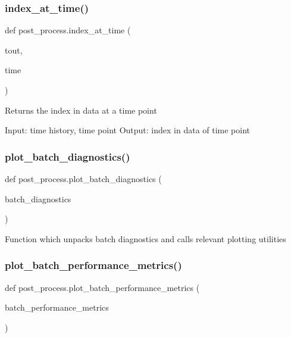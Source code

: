 \subsubsection{\texorpdfstring{index\_at\_time()}{index\_at\_time()}}
{\footnotesize\ttfamily def post\+\_\+process.\+index\+\_\+at\+\_\+time (\begin{DoxyParamCaption}\item[{}]{tout,  }\item[{}]{time }\end{DoxyParamCaption})}

\begin{DoxyVerb}Returns the index in data at a time point

Input: time history, time point
Output: index in data of time point\end{DoxyVerb}
 \mbox{\label{namespacepost__process_ad0319250940975f4989aef2f6e3a96b7}} 
\subsubsection{\texorpdfstring{plot\_batch\_diagnostics()}{plot\_batch\_diagnostics()}}
{\footnotesize\ttfamily def post\+\_\+process.\+plot\+\_\+batch\+\_\+diagnostics (\begin{DoxyParamCaption}\item[{}]{batch\+\_\+diagnostics }\end{DoxyParamCaption})}

\begin{DoxyVerb}Function which unpacks batch diagnostics and calls relevant plotting utilities
\end{DoxyVerb}
 \mbox{\label{namespacepost__process_aa4445a673ad2b57be4e22fe0e1cf2413}} 
\subsubsection{\texorpdfstring{plot\_batch\_performance\_metrics()}{plot\_batch\_performance\_metrics()}}
{\footnotesize\ttfamily def post\+\_\+process.\+plot\+\_\+batch\+\_\+performance\+\_\+metrics (\begin{DoxyParamCaption}\item[{}]{batch\+\_\+performance\+\_\+metrics }\end{DoxyParamCaption})}

